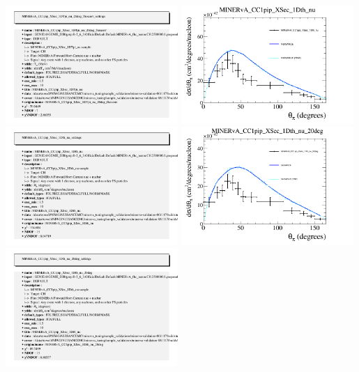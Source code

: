 \documentclass{article}
\begin{document}
\includegraphics[width=0.49\textwidth]{figures/nuisance_MINERvA_CC1pip_XSec_1DTpi_nu_20deg_fluxcorr_info.png}
\centering
\includegraphics[width=0.49\textwidth]{figures/nuisance_MINERvA_CC1pip_XSec_1Dth_nu_comp.png}
\includegraphics[width=0.49\textwidth]{figures/nuisance_MINERvA_CC1pip_XSec_1Dth_nu_info.png}
\centering
\includegraphics[width=0.49\textwidth]{figures/nuisance_MINERvA_CC1pip_XSec_1Dth_nu_20deg_comp.png}
\includegraphics[width=0.49\textwidth]{figures/nuisance_MINERvA_CC1pip_XSec_1Dth_nu_20deg_info.png}
\end{document}
